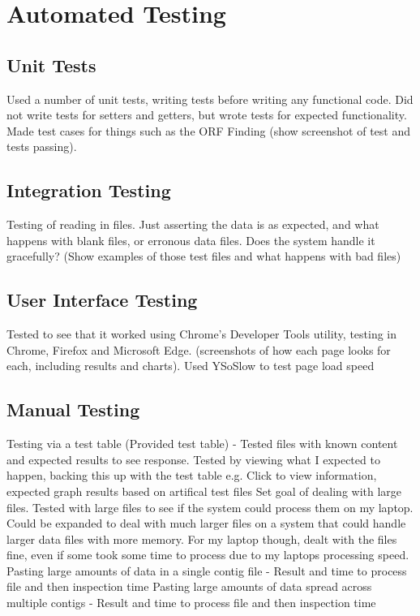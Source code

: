 
\section{Automated Testing}
\subsection{Unit Tests}
Used a number of unit tests, writing tests before writing any functional code. Did not write tests for setters and getters, but wrote tests for expected functionality. Made test cases for things such as the ORF Finding (show screenshot of test and tests passing).

\subsection{Integration Testing}
Testing of reading in files. Just asserting the data is as expected, and what happens with blank files, or erronous data files. Does the system handle it gracefully? (Show examples of those test files and what happens with bad files)

\subsection{User Interface Testing}
Tested to see that it worked using Chrome's Developer Tools utility, testing in Chrome, Firefox and Microsoft Edge. (screenshots of how each page looks for each, including results and charts). Used YSoSlow to test page load speed


\subsection{Manual Testing}
Testing via a test table (Provided test table) - Tested files with known content and expected results to see response. Tested by viewing what I expected to happen, backing this up with the test table e.g. Click to view information, expected graph results based on artifical test files
Set goal of dealing with large files. Tested with large files to see if the system could process them on my laptop. Could be expanded to deal with much larger files on a system that could handle larger data files with more memory. For my laptop though, dealt with the files fine, even if some took some time to process due to my laptops processing speed.
Pasting large amounts of data in a single contig file - Result and time to process file and then inspection time
Pasting large amounts of data spread across multiple contigs - Result and time to process file and then inspection time

